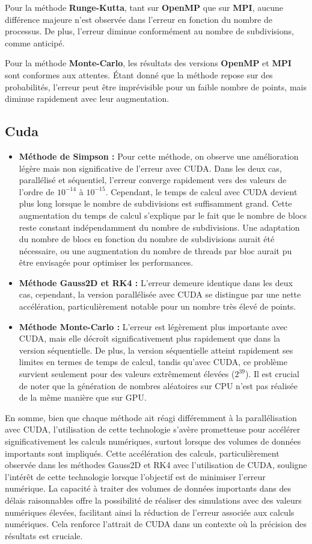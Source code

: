 \documentclass[10pt,a4paper]{article}
\begin{document}
Pour la méthode \textbf{Runge-Kutta}, tant sur \textbf{OpenMP} que sur \textbf{MPI}, aucune différence majeure n'est observée dans l'erreur en fonction du nombre de processus. De plus, l'erreur diminue conformément au nombre de subdivisions, comme anticipé.

Pour la méthode \textbf{Monte-Carlo}, les résultats des versions \textbf{OpenMP} et \textbf{MPI} sont conformes aux attentes. Étant donné que la méthode repose sur des probabilités, l'erreur peut être imprévisible pour un faible nombre de points, mais diminue rapidement avec leur augmentation.

\subsection*{Cuda}
\begin{itemize}
    \item \textbf{Méthode de Simpson :} Pour cette méthode, on observe une amélioration légère mais non significative de l'erreur avec CUDA. Dans les deux cas, parallélisé et séquentiel, l'erreur converge rapidement vers des valeurs de l'ordre de $10^{-14}$ à $10^{-15}$. Cependant, le temps de calcul avec CUDA devient plus long lorsque le nombre de subdivisions est suffisamment grand. Cette augmentation du temps de calcul s'explique par le fait que le nombre de blocs reste constant indépendamment du nombre de subdivisions. Une adaptation du nombre de blocs en fonction du nombre de subdivisions aurait été nécessaire, ou une augmentation du nombre de threads par bloc aurait pu être envisagée pour optimiser les performances.
    \item \textbf{Méthode Gauss2D et RK4 :} L'erreur demeure identique dans les deux cas, cependant, la version parallélisée avec CUDA se distingue par une nette accélération, particulièrement notable pour un nombre très élevé de points.
    \item \textbf{Méthode Monte-Carlo :} L'erreur est légèrement plus importante avec CUDA, mais elle décroît significativement plus rapidement que dans la version séquentielle. De plus, la version séquentielle atteint rapidement ses limites en termes de temps de calcul, tandis qu'avec CUDA, ce problème survient seulement pour des valeurs extrêmement élevées ($2^{39}$). Il est crucial de noter que la génération de nombres aléatoires sur CPU n'est pas réalisée de la même manière que sur GPU.
\end{itemize}
En somme, bien que chaque méthode ait réagi différemment à la parallélisation avec CUDA, l'utilisation de cette technologie s'avère prometteuse pour accélérer significativement les calculs numériques, surtout lorsque des volumes de données importants sont impliqués. Cette accélération des calculs, particulièrement observée dans les méthodes Gauss2D et RK4 avec l'utilisation de CUDA, souligne l'intérêt de cette technologie lorsque l'objectif est de minimiser l'erreur numérique. La capacité à traiter des volumes de données importants dans des délais raisonnables offre la possibilité de réaliser des simulations avec des valeurs numériques élevées, facilitant ainsi la réduction de l'erreur associée aux calculs numériques. Cela renforce l'attrait de CUDA dans un contexte où la précision des résultats est cruciale.
\end{document}
